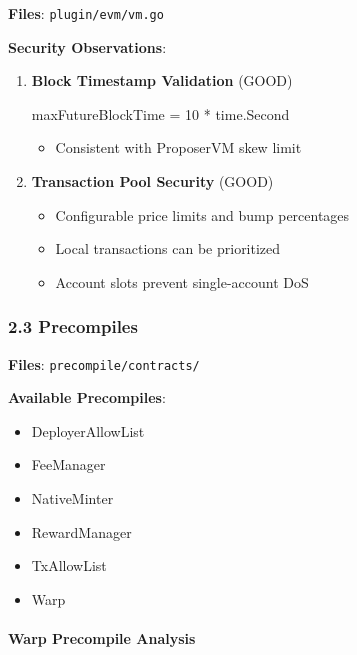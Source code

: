 \documentclass[
]{article}
\newenvironment{Shaded}{}{}
\newcommand{\DecValTok}[1]{\textcolor[rgb]{0.25,0.63,0.44}{#1}}
\newcommand{\NormalTok}[1]{#1}
\newcommand{\OperatorTok}[1]{\textcolor[rgb]{0.40,0.40,0.40}{#1}}
\providecommand{\tightlist}{%
  \setlength{\itemsep}{0pt}\setlength{\parskip}{0pt}}
\begin{document}
\textbf{Files}: \texttt{plugin/evm/vm.go}

\textbf{Security Observations}:

\begin{enumerate}
\def\labelenumi{\arabic{enumi}.}
\item
  \textbf{Block Timestamp Validation} (GOOD)

\begin{Shaded}
\begin{Highlighting}[]
\NormalTok{maxFutureBlockTime }\OperatorTok{=} \DecValTok{10} \OperatorTok{*}\NormalTok{ time}\OperatorTok{.}\NormalTok{Second}
\end{Highlighting}
\end{Shaded}

  \begin{itemize}
  \tightlist
  \item
    Consistent with ProposerVM skew limit
  \end{itemize}
\item
  \textbf{Transaction Pool Security} (GOOD)

  \begin{itemize}
  \tightlist
  \item
    Configurable price limits and bump percentages
  \item
    Local transactions can be prioritized
  \item
    Account slots prevent single-account DoS
  \end{itemize}
\end{enumerate}

\subsubsection{2.3 Precompiles}\label{23-precompiles}

\textbf{Files}: \texttt{precompile/contracts/}

\textbf{Available Precompiles}:

\begin{itemize}
\tightlist
\item
  DeployerAllowList
\item
  FeeManager
\item
  NativeMinter
\item
  RewardManager
\item
  TxAllowList
\item
  Warp
\end{itemize}

\paragraph{Warp Precompile Analysis}\label{warp-precompile-analysis}
\end{document}
